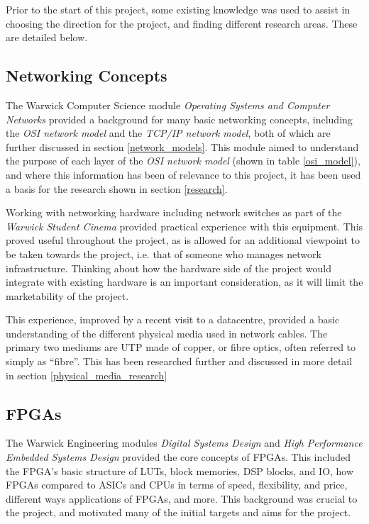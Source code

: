 Prior to the start of this project, some existing knowledge was used to assist in choosing the direction for the project, and finding different research areas. These are detailed below.

\subsection{Networking Concepts}
\label{networking_concepts_introduction}
The Warwick Computer Science module \textit{Operating Systems and Computer Networks} \cite{cs241} provided a background for many basic networking concepts, including the \textit{OSI network model} and the \textit{TCP/IP network model}, both of which are further discussed in section \ref{network_models}. This module aimed to understand the purpose of each layer of the \textit{OSI network model} (shown in table \ref{osi_model}), and where this information has been of relevance to this project, it has been used a basis for the research shown in section \ref{research}.

Working with networking hardware including network switches as part of the \textit{Warwick Student Cinema} \cite{wsc} provided practical experience with this equipment. This proved useful throughout the project, as is allowed for an additional viewpoint to be taken towards the project, i.e. that of someone who manages network infrastructure. Thinking about how the hardware side of the project would integrate with existing hardware is an important consideration, as it will limit the marketability of the project.

This experience, improved by a recent visit to a datacentre, provided a basic understanding of the different physical media used in network cables. The primary two mediums are UTP made of copper, or fibre optics, often referred to simply as ``fibre''. This has been researched further and discussed in more detail in section \ref{physical_media_research}






\subsection{FPGAs}
\label{fpgas}

The Warwick Engineering modules \textit{Digital Systems Design} \cite{es3b2} and \textit{High Performance Embedded Systems Design} \cite{es3f1} provided the core concepts of FPGAs. This included the FPGA's basic structure of LUTs, block memories, DSP blocks, and IO, how FPGAs compared to ASICs and CPUs in terms of speed, flexibility, and price, different ways applications of FPGAs, and more. This background was crucial to the project, and motivated many of the initial targets and aims for the project.


